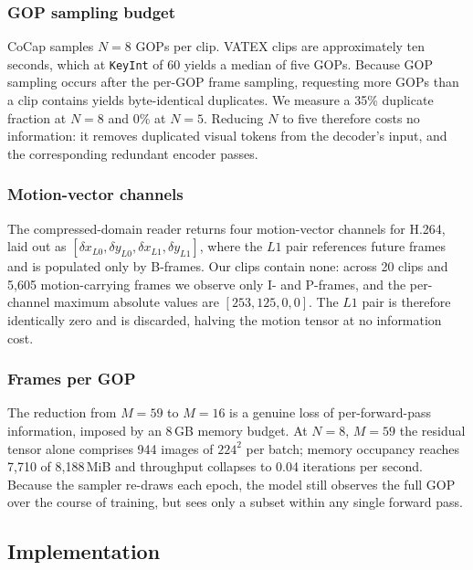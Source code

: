 \documentclass[10pt,twocolumn,letterpaper]{article}
\begin{document}
\subsubsection{GOP sampling budget}
\label{sec:gop}

CoCap samples $N = 8$ GOPs per clip. VATEX clips are approximately ten seconds, which at
\texttt{KeyInt} of 60 yields a median of five GOPs. Because GOP sampling occurs after the
per-GOP frame sampling, requesting more GOPs than a clip contains yields byte-identical
duplicates. We measure a 35\% duplicate fraction at $N = 8$ and 0\% at $N = 5$. Reducing $N$ to
five therefore costs no information: it removes duplicated visual tokens from the decoder's
input, and the corresponding redundant encoder passes.

\subsubsection{Motion-vector channels}
\label{sec:mv}

The compressed-domain reader returns four motion-vector channels for H.264, laid out as
$[\delta x_{L0}, \delta y_{L0}, \delta x_{L1}, \delta y_{L1}]$, where the $L1$ pair references
future frames and is populated only by B-frames. Our clips contain none: across 20 clips and
5{,}605 motion-carrying frames we observe only I- and P-frames, and the per-channel maximum
absolute values are $[253, 125, 0, 0]$. The $L1$ pair is therefore identically zero and is
discarded, halving the motion tensor at no information cost.

\subsubsection{Frames per GOP}

The reduction from $M = 59$ to $M = 16$ is a genuine loss of per-forward-pass information,
imposed by an 8\,GB memory budget. At $N = 8$, $M = 59$ the residual tensor alone comprises 944
images of $224^2$ per batch; memory occupancy reaches 7{,}710 of 8{,}188\,MiB and throughput
collapses to 0.04 iterations per second. Because the sampler re-draws each epoch, the model
still observes the full GOP over the course of training, but sees only a subset within any
single forward pass.

\subsection{Implementation}
\end{document}
